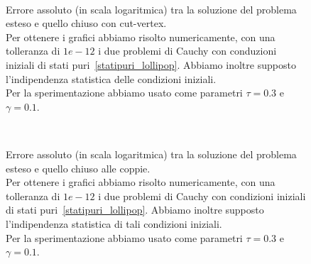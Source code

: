 \begin{figure}[!htb]
\centering
\subfloat[][Nodo 1]{}
\subfloat[][Nodo 2]{ }
\\
\subfloat[][Nodo 3]{}
\subfloat[][Nodo 4]{}

\caption[Errori assoluti relativi al grafo~\ref{fig::lollipop} tra il modello esatto e con cut-vertex] {Errore assoluto (in scala logaritmica) tra la soluzione del problema esteso  e quello chiuso con cut-vertex.\\
Per ottenere i grafici abbiamo risolto numericamente, con una tolleranza di $1e-12$ i due problemi di Cauchy con conduzioni iniziali di stati puri~\eqref{statipuri_lollipop}. Abbiamo inoltre supposto l'indipendenza statistica delle condizioni iniziali.\\
Per la sperimentazione abbiamo usato come parametri $\tau = 0.3$ e $\gamma = 0.1$.}
\label{fig::lollipop_errori}
\end{figure}


\begin{figure}[!htb]
\subfloat[][Nodo 1]{}
\subfloat[][Nodo 2]{}
\\
\subfloat[][Nodo 3]{}
\subfloat[][Nodo 4]{}
\caption[Errori assoluti relativi al grafo~\ref{fig::lollipop} tra il modello esatto e quello chiuso alle coppie] {Errore assoluto (in scala logaritmica) tra la soluzione del problema esteso  e quello chiuso alle coppie.\\
Per ottenere i grafici abbiamo risolto numericamente, con una tolleranza di $1e-12$ i due problemi di Cauchy con condizioni iniziali di stati puri~\eqref{statipuri_lollipop}. Abbiamo inoltre supposto l'indipendenza statistica di tali condizioni iniziali.\\
Per la sperimentazione abbiamo usato come parametri $\tau = 0.3$ e $\gamma = 0.1$.}
\label{fig::lollipop_errori_pair}

\end{figure}


 
